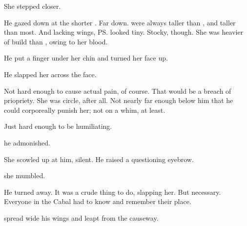 \begin{garbage}
 She stepped closer. 

\index{\resvil}
He gazed down at the shorter \resvil. 
Far down. 
\Resphain{} were always taller than \resviel, and \Teshrial{} taller than most. 
And lacking wings, \ps{\Achsah}{} looked tiny. 
Stocky, though. 
She was heavier of build than \Teshrial, owing to her \nephilic{} blood. 

He put a finger under her chin and turned her face up. 


He slapped her across the face. 

Not hard enough to cause actual pain, of course. 
That would be a breach of priopriety. 
She was \achsahcircle{} circle, after all. 
Not nearly far enough below him that he could corporeally punish her; 
not on a whim, at least.

Just hard enough to be humiliating. 

 he admonished. 

She scowled up at him, silent. 
He raised a questioning eyebrow. 

 she mumbled. 

He turned away. 
It was a crude thing to do, slapping her.
But necessary. 
Everyone in the Cabal had to know and remember their place. 


\Teshrial{} spread wide his wings and leapt from the causeway. 
 
\end{garbage}










